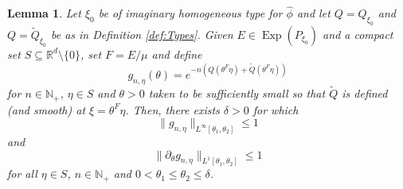 \documentclass[11pt]{article}
\newtheorem{lemma}[theorem]{Lemma}
\newcommand\Exp{\operatorname{Exp}}
\begin{document}


\begin{lemma}\label{lem:dGInequalities}
Let $\xi_0$ be of imaginary homogeneous type for $\widehat{\phi}$ and let $Q=Q_{\xi_0}$ and $Q=\widetilde{Q}_{\xi_0}$ be as in Definition \ref{def:Types}. Given $E\in\Exp(P_{\xi_0})$ and a compact set $S\subseteq\mathbb{R}^d\setminus\{0\}$, set $F=E/\mu$ and define
\begin{equation*}
g_{n,\eta}(\theta)=e^{-n\left(Q(\theta^F\eta)+\widetilde{Q}(\theta^F\eta)\right)}
\end{equation*}
for $n\in\mathbb{N}_+$, $\eta\in S$ and $\theta>0$ taken to be sufficiently small so that $\widetilde{Q}$ is defined (and smooth) at $\xi=\theta^F\eta$. Then, there exists $\delta>0$ for which 
\begin{equation*}
    \|g_{n,\eta}\|_{L^\infty[\theta_1,\theta_2]}\leq 1
\end{equation*}
and
\begin{equation*}
     \|\partial_\theta g_{n,\eta}\|_{L^1[\theta_1,\theta_2]}\leq 1
\end{equation*}
for all $\eta\in S$, $n\in\mathbb{N}_+$ and $0<\theta_1\leq\theta_2\leq \delta$.
\end{lemma}
\end{document}
